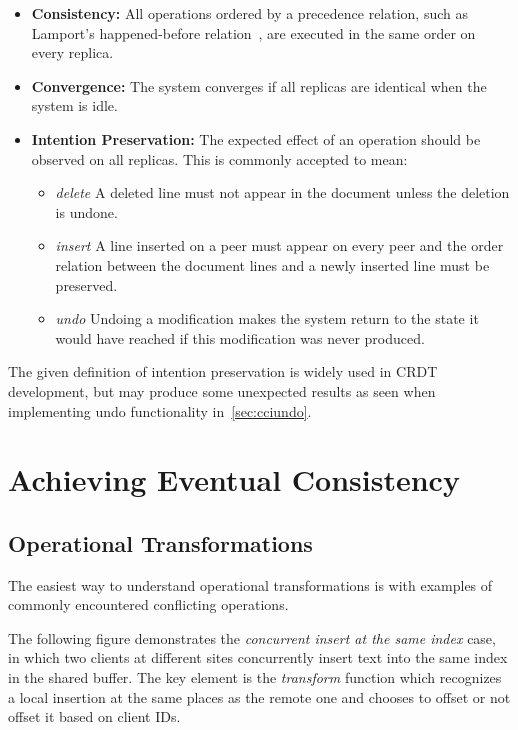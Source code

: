 \documentclass[12pt,a4paper,twoside,openright]{report}
\begin{document}
	\begin{itemize}
		\item \textbf{Consistency:} All operations ordered by a precedence relation, such as Lamport's happened-before relation~\cite{lamport1978}, are executed in the same order on every replica.
	
		\item \textbf{Convergence:} The system converges if all replicas are identical when the system is idle.
		
		\item \textbf{Intention Preservation:} The expected effect of an operation should be observed on all replicas. This is commonly accepted to mean:

			\begin{itemize}
				\item \textit{delete}  A deleted line must not appear in the document unless the deletion is undone.
				
				\item \textit{insert}  A line inserted on a peer must appear on every peer and the order relation between the document lines and a newly inserted line must be preserved.
				
				\item  \textit{undo}  Undoing a modification makes the system return to the state it would have reached if this modification was never produced.
				
			\end{itemize}	
		
	\end{itemize}
	
	The given definition of intention preservation is widely used in CRDT development, but may produce some unexpected results as seen when implementing undo functionality in~\cref{sec:cciundo}.
	

\section{Achieving Eventual Consistency}

	\subsection{Operational Transformations}
	
	The easiest way to understand operational transformations is with examples of commonly encountered conflicting operations.
	
	The following figure demonstrates the \textit{concurrent insert at the same index} case, in which two clients at different sites concurrently insert text into the same index in the shared buffer. The key element is the \textit{transform} function which recognizes a local insertion at the same places as the remote one and chooses to offset or not offset it based on client IDs.
	
\end{document}
